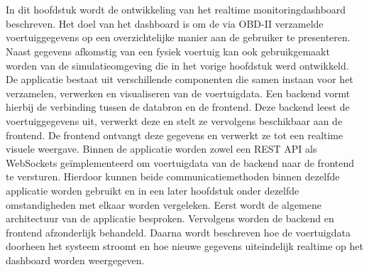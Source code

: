 \chapter{}%
\label{ch:ontwikkeling-van-een-realtime-monitoringdashboard}
In dit hoofdstuk wordt de ontwikkeling van het realtime monitoringdashboard beschreven. Het doel van het dashboard is om de via OBD-II verzamelde voertuiggegevens op een overzichtelijke manier aan de gebruiker te presenteren. Naast gegevens afkomstig van een fysiek voertuig kan ook gebruikgemaakt worden van de simulatieomgeving die in het vorige hoofdstuk werd ontwikkeld.
De applicatie bestaat uit verschillende componenten die samen instaan voor het verzamelen, verwerken en visualiseren van de voertuigdata. Een backend vormt hierbij de verbinding tussen de databron en de frontend. Deze backend leest de voertuiggegevens uit, verwerkt deze en stelt ze vervolgens beschikbaar aan de frontend. De frontend ontvangt deze gegevens en verwerkt ze tot een realtime visuele weergave.
Binnen de applicatie worden zowel een REST API als WebSockets geïmplementeerd om voertuigdata van de backend naar de frontend te versturen. Hierdoor kunnen beide communicatiemethoden binnen dezelfde applicatie worden gebruikt en in een later hoofdstuk onder dezelfde omstandigheden met elkaar worden vergeleken.
Eerst wordt de algemene architectuur van de applicatie besproken. Vervolgens worden de backend en frontend afzonderlijk behandeld. Daarna wordt beschreven hoe de voertuigdata doorheen het systeem stroomt en hoe nieuwe gegevens uiteindelijk realtime op het dashboard worden weergegeven.

